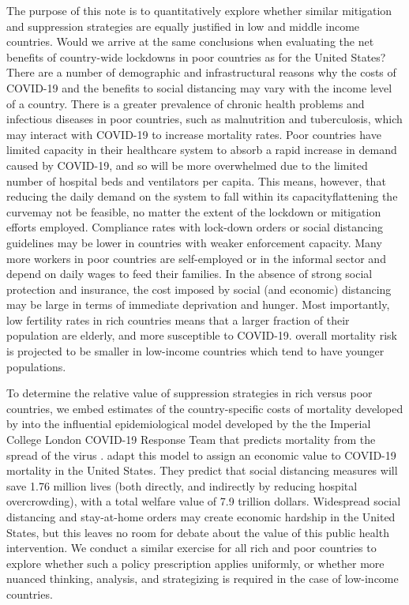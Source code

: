 \documentclass[11pt]{article}
\begin{document}
\begin{mdframed}
The purpose of this note is to quantitatively explore whether similar mitigation and suppression strategies are equally justified in low and middle income countries. Would we arrive at the same conclusions when evaluating the net benefits of country-wide lockdowns in poor countries as for the United States? There are a number of demographic and infrastructural reasons why the costs of COVID-19 and the benefits to social distancing may vary with the income level of a country.  There is a greater prevalence of chronic health problems and infectious diseases in poor countries, such as malnutrition and tuberculosis, which may interact with COVID-19 to increase mortality rates. Poor countries have limited capacity in their healthcare system to absorb a rapid increase in demand caused by COVID-19, and so will be more overwhelmed due to the limited number of hospital beds and ventilators per capita. This means, however, that reducing the daily demand on the system to fall within its capacity\textemdash flattening the curve\textemdash may not be feasible, no matter the extent of the lockdown or mitigation efforts employed. Compliance rates with lock-down orders or social distancing guidelines may be lower in countries with weaker enforcement capacity. Many more workers in poor countries are self-employed or in the informal sector and depend on daily wages to feed their families. In the absence of strong social protection and insurance, the cost imposed by social (and economic) distancing may be large in terms of immediate deprivation and hunger. Most importantly, low fertility rates in rich countries means that a larger fraction of their population are elderly, and more susceptible to COVID-19. overall mortality risk is projected to be smaller in low-income countries which tend to have younger populations.

To determine the relative value of suppression strategies in rich versus poor countries, we embed estimates of the country-specific costs of mortality developed by \textcite{viscusi2017} into the influential epidemiological model developed by the the Imperial College London COVID-19 Response Team that predicts mortality from the spread of the virus \parencite{ferguson2020}. \textcite{greenstone2020} adapt this model to assign an economic value to COVID-19 mortality in the United States. They predict that social distancing measures will save 1.76 million lives (both directly, and indirectly by reducing hospital overcrowding), with a total welfare value of 7.9 trillion dollars. Widespread social distancing and stay-at-home orders may create economic hardship in the United States, but this leaves no room for debate about the value of this public health intervention. We conduct a similar exercise for all rich and poor countries to explore whether such a policy prescription applies uniformly, or whether more nuanced thinking, analysis, and strategizing is required in the case of low-income countries.



\end{mdframed}
\end{document}
